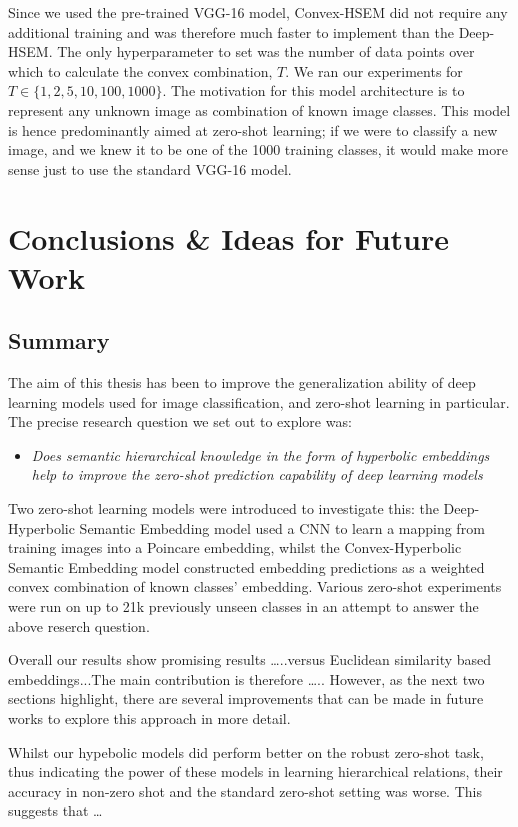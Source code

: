 \documentclass[12pt]{report}
\begin{document}
Since we used the pre-trained VGG-16 model, Convex-HSEM did not require any additional training and was therefore much faster to implement than the Deep-HSEM. The only hyperparameter to set was the number of data points over which to calculate the convex combination, $T$. We ran our experiments for 
$T \in \{1, 2, 5, 10, 100, 1000\}$. The motivation for this model architecture is to represent any unknown image as combination of known image classes. This model is hence predominantly aimed at zero-shot learning; if we were to classify a new image, and we knew it to be one of the 1000 training classes, it would make more sense just to use the standard VGG-16 model.

\newpage
\chapter{Conclusions \& Ideas for Future Work}

\section{Summary}
The aim of this thesis has been to improve the generalization ability of deep learning models used for image classification, and zero-shot learning in particular. The precise research question we set out to explore was: 
\begin{itemize}
\item \textit{Does semantic hierarchical knowledge in the form of hyperbolic embeddings help to improve the zero-shot prediction capability of deep learning models}
\end{itemize}
Two zero-shot learning models were introduced to investigate this: the Deep-Hyperbolic Semantic Embedding model used a CNN to learn a mapping from training images into a Poincare embedding, whilst the Convex-Hyperbolic Semantic Embedding model constructed embedding predictions as a weighted convex combination of known classes' embedding. Various zero-shot experiments were run on up to 21k previously unseen classes in an attempt to answer the above reserch question.

Overall our results show promising results \dots..versus Euclidean similarity based embeddings...The main contribution is therefore \dots.. However, as the next two sections highlight, there are several improvements that can be made in future works to explore this approach in more detail.

Whilst our hypebolic models did perform better on the robust zero-shot task, thus indicating the power of these models in learning hierarchical relations, their accuracy in non-zero shot and the standard zero-shot setting was worse. This suggests that \dots 
\end{document}
